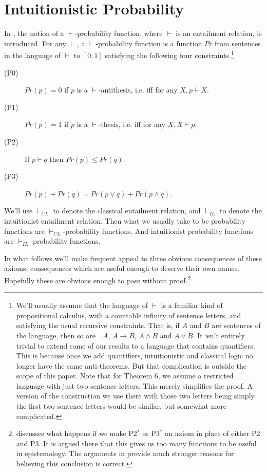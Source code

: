 \section{Intuitionistic Probability}
In \citet{Weatherson2003}, the notion of a $\vdash$-probability function, where $\vdash$ is an entailment relation, is introduced. For any $\vdash$, a $\vdash$-probability function is a function $Pr$ from sentences in the language of $\vdash$ to $[0, 1]$ satisfying the following four constraints.\footnote{We'll usually assume that the language of $\vdash$ is a familiar kind of propositional calculus, with a countable infinity of sentence letters, and satisfying the usual recursive constraints. That is, if $A$ and $B$ are sentences of the language, then so are $\neg A$, $A \rightarrow B$, $A \wedge B$ and $A \vee B$. It isn't entirely trivial to extend some of our results to a language that contains  quantifiers. This is because once we add quantifiers, intuitionistic and classical logic no longer have the same anti-theorems. But that complication is outside the scope of this paper. Note that for Theorem 6, we assume a restricted language with just two sentence letters. This merely simplifies the proof. A version of the construction we use there with those two letters being simply the first two sentence letters would be similar, but somewhat more complicated.}

\begin{description}
\item[(P0)] $Pr(p) = 0$ if $p$ is a $\vdash$-antithesis, i.e. iff for any $X, p \vdash X$.
\item[(P1)] $Pr(p) = 1$ if $p$ is a $\vdash$-thesis, i.e. iff for any $X, X \vdash p$.
\item[(P2)] If $p \vdash q$ then $Pr(p) \leq Pr(q)$.
\item[(P3)] $Pr(p) + Pr(q) = Pr(p \vee q) + Pr(p \wedge q)$.
\end{description}

\noindent We'll use $\vdash_{CL}$ to denote the classical entailment relation, and $\vdash_{IL}$ to denote the intuitionist entailment relation. Then what we usually take to be probability functions are $\vdash_{CL}$-probability functions. And intuitionist probability functions are $\vdash_{IL}$-probability functions. 

In what follows we'll make frequent appeal to three obvious consequences of these axioms, consequences which are useful enough to deserve their own names. Hopefully these are obvious enough to pass without proof.\footnote{\citet{Weatherson2003} discusses what happens if we make P2$^*$ or P3$^*$ an axiom in place of either P2 and P3. It is argued there that this gives us too many functions to be useful in epistemology. The arguments in \citet{Williamsms} provide much stronger reasons for believing this conclusion is correct.}

